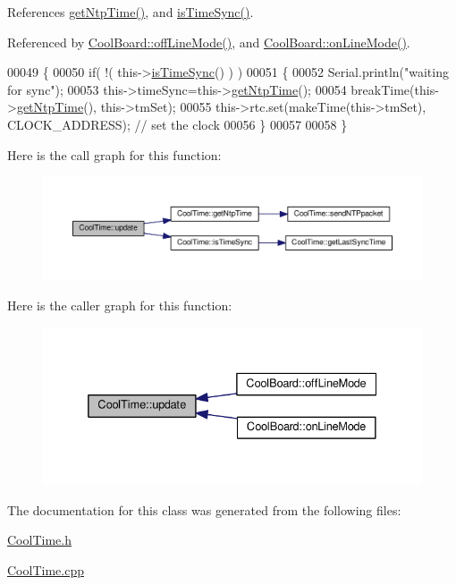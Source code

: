 References \hyperlink{_cool_time_8cpp_source_l00161}{get\+Ntp\+Time()}, and \hyperlink{_cool_time_8cpp_source_l00141}{is\+Time\+Sync()}.



Referenced by \hyperlink{_cool_board_8cpp_source_l00187}{Cool\+Board\+::off\+Line\+Mode()}, and \hyperlink{_cool_board_8cpp_source_l00097}{Cool\+Board\+::on\+Line\+Mode()}.


\begin{DoxyCode}
00049 \{
00050     \textcolor{keywordflow}{if}( !( this->\hyperlink{class_cool_time_a5ae038a4498602b189f76a10bf02adf8}{isTimeSync}() ) )
00051     \{
00052         Serial.println(\textcolor{stringliteral}{"waiting for sync"});
00053         this->timeSync=this->\hyperlink{class_cool_time_a41fbbbfd651c2079f54d4b2911e4c705}{getNtpTime}();
00054         breakTime(this->\hyperlink{class_cool_time_a41fbbbfd651c2079f54d4b2911e4c705}{getNtpTime}(), this->tmSet);
00055         this->rtc.set(makeTime(this->tmSet), CLOCK\_ADDRESS); \textcolor{comment}{// set the clock}
00056     \}
00057     
00058 \}
\end{DoxyCode}
Here is the call graph for this function\+:
\nopagebreak
\begin{figure}[H]
\begin{center}
\leavevmode
\includegraphics[width=350pt]{class_cool_time_aae601f795452cfa48d9fb337aed483a8_cgraph}
\end{center}
\end{figure}
Here is the caller graph for this function\+:
\nopagebreak
\begin{figure}[H]
\begin{center}
\leavevmode
\includegraphics[width=332pt]{class_cool_time_aae601f795452cfa48d9fb337aed483a8_icgraph}
\end{center}
\end{figure}


The documentation for this class was generated from the following files\+:\begin{DoxyCompactItemize}
\item 
\hyperlink{_cool_time_8h}{Cool\+Time.\+h}\item 
\hyperlink{_cool_time_8cpp}{Cool\+Time.\+cpp}\end{DoxyCompactItemize}
